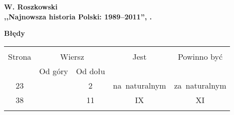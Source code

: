 \documentclass[a4paper,11pt]{article}
\newcommand{\spaceOne}{2em}
\newcommand{\tb}{\textbf}
\newcommand{\noi}{\noindent}
\newcommand{\start}{\noi \tb{--} {}}
\newcommand{\Center}[1]{\begin{center} #1 \end{center}}
\newcommand{\CenterTB}[1]{\Center{\tb{#1}}}
\newcommand{\Str}[1]{\tb{Str. #1.}}
\newcommand{\StrWd}[2]{\tb{Str. #1, wiersz #2 (od dołu).}}
\newcommand{\Work}[1]{ \begin{center} {\large \tb{#1}} \end{center} }
\begin{document}
\vspace{\spaceOne}



\Work{
  W. Roszkowski \\
  ,,Najnowsza historia Polski: 1989--2011'', \cite{Ros11g}.}








\CenterTB{Błędy}
\begin{center}
  \begin{tabular}{|c|c|c|c|c|}
    \hline
    & \multicolumn{2}{c|}{} & & \\
    Strona & \multicolumn{2}{c|}{Wiersz}& Jest & Powinno być \\ \cline{2-3}
    & Od góry & Od dołu &  &  \\ \hline
    23 & & 2 & na~naturalnym & za~naturalnym \\
    38 & & 11 & IX & XI \\
    & & & & \\ \hline
  \end{tabular}
\end{center}
\end{document}
